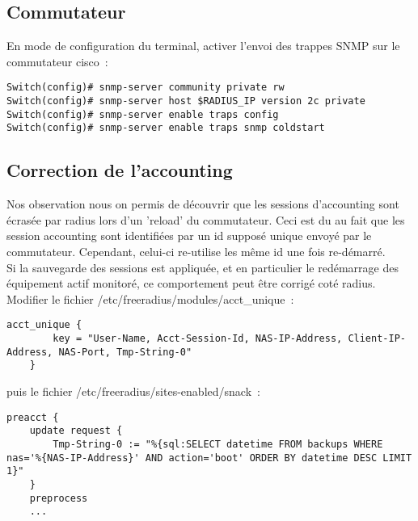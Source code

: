 \subsection{Commutateur}

En mode de configuration du terminal, activer l'envoi des trappes SNMP sur le commutateur cisco~:

\begin{lstlisting}
Switch(config)# snmp-server community private rw
Switch(config)# snmp-server host $RADIUS_IP version 2c private
Switch(config)# snmp-server enable traps config
Switch(config)# snmp-server enable traps snmp coldstart
\end{lstlisting}


\subsection{Correction de l'accounting}

Nos observation nous on permis de découvrir que les sessions d'accounting sont écrasée par radius lors d'un 'reload' du commutateur. Ceci est du au fait que les session accounting sont identifiées par un id supposé unique envoyé par le commutateur. Cependant, celui-ci re-utilise les même id une fois re-démarré.\\

Si la sauvegarde des sessions est appliquée, et en particulier le redémarrage des équipement actif monitoré, ce comportement peut être corrigé coté radius.\\
Modifier le fichier /etc/freeradius/modules/acct\_unique~:
\begin{lstlisting}
acct_unique {
        key = "User-Name, Acct-Session-Id, NAS-IP-Address, Client-IP-Address, NAS-Port, Tmp-String-0"
	}
\end{lstlisting}

puis le fichier /etc/freeradius/sites-enabled/snack~:
\begin{lstlisting}
preacct {
	update request {
		Tmp-String-0 := "%{sql:SELECT datetime FROM backups WHERE nas='%{NAS-IP-Address}' AND action='boot' ORDER BY datetime DESC LIMIT 1}"
	}
	preprocess
	...
\end{lstlisting}

